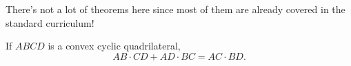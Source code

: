 There's not a lot of theorems here since most of them are already
covered in the standard curriculum!
\begin{theorem}
    \label{thm: ptolemy}
    If $ABCD$ is a convex cyclic quadrilateral,
    \[ AB \cdot CD + AD \cdot BC = AC \cdot BD. \]
\end{theorem}
